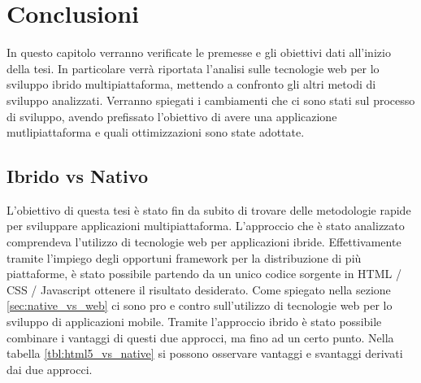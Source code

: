 \chapter{Conclusioni}
In questo capitolo verranno verificate le premesse e gli obiettivi dati all'inizio della tesi. In particolare verrà riportata l'analisi sulle tecnologie web per lo sviluppo ibrido multipiattaforma, mettendo a confronto gli altri metodi di sviluppo analizzati.
Verranno spiegati i cambiamenti che ci sono stati sul processo di sviluppo, avendo prefissato l'obiettivo di avere una applicazione mutlipiattaforma e quali ottimizzazioni sono state adottate. 

\section{Ibrido vs Nativo}
L'obiettivo di questa tesi è stato fin da subito di trovare delle metodologie rapide per sviluppare applicazioni multipiattaforma. L'approccio che è stato analizzato comprendeva l'utilizzo di tecnologie web per applicazioni ibride.
Effettivamente tramite l'impiego degli opportuni framework per la distribuzione di più piattaforme, è stato possibile partendo da un unico codice sorgente in HTML / CSS / Javascript ottenere il risultato desiderato.
Come spiegato nella sezione \ref{sec:native_vs_web} ci sono pro e contro sull'utilizzo di tecnologie web per lo sviluppo di applicazioni mobile. Tramite l'approccio ibrido è stato possibile combinare i vantaggi di questi due approcci, ma fino ad un certo punto. Nella tabella \ref{tbl:html5_vs_native} si possono osservare vantaggi e svantaggi derivati dai due approcci.


